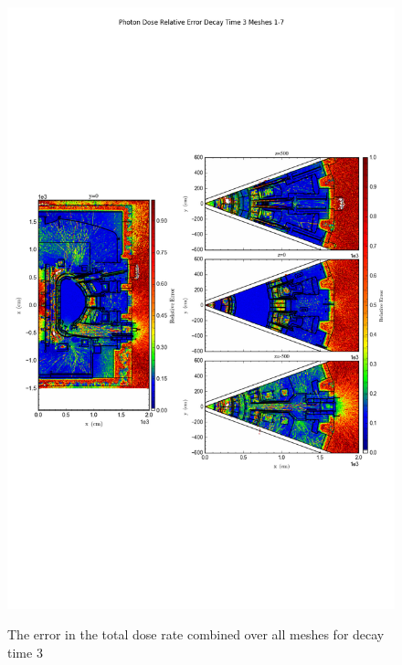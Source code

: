 \documentclass[12pt]{article}
\begin{document}
\begin{figure}[ht!]
\centering
\includegraphics[trim={0cm 9cm 0cm 10cm},clip,scale=0.75]{../plots/final_model/Photon_Dose_Relative_Error_Decay_Time_3_Meshes_1-7.png}
\label{fig:photons_dc3_b4c_total_error}
\caption{The error in the total dose rate combined over all meshes for decay time 3}
\end{figure}
\end{document}
